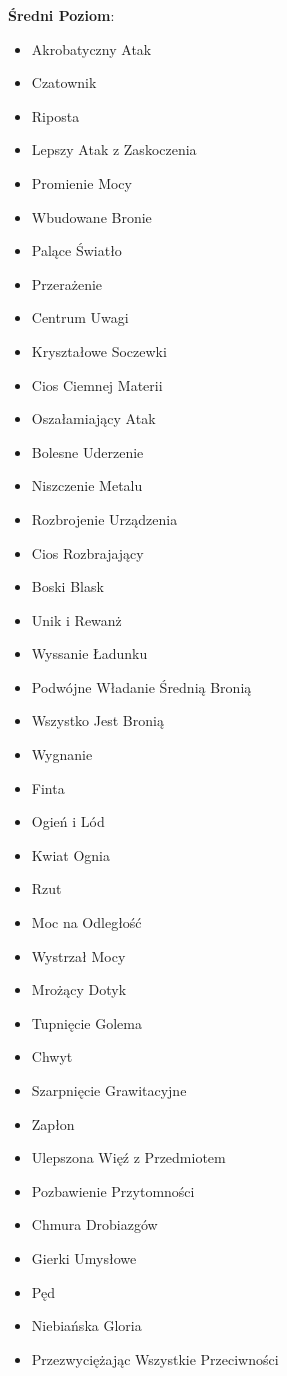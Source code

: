 \textbf{Średni Poziom}:

\begin{itemize}
\item Akrobatyczny Atak
\item Czatownik
\item Riposta
\item Lepszy Atak z Zaskoczenia
\item Promienie Mocy
\item Wbudowane Bronie
\item Palące Światło
\item Przerażenie
\item Centrum Uwagi
\item Kryształowe Soczewki
\item Cios Ciemnej Materii
\item Oszałamiający Atak
\item Bolesne Uderzenie
\item Niszczenie Metalu
\item Rozbrojenie Urządzenia
\item Cios Rozbrajający
\item Boski Blask
\item Unik i Rewanż
\item Wyssanie Ładunku
\item Podwójne Władanie Średnią Bronią
\item Wszystko Jest Bronią
\item Wygnanie
\item Finta
\item Ogień i Lód
\item Kwiat Ognia
\item Rzut
\item Moc na Odległość
\item Wystrzał Mocy
\item Mrożący Dotyk
\item Tupnięcie Golema
\item Chwyt
\item Szarpnięcie Grawitacyjne
\item Zapłon
\item Ulepszona Więź z Przedmiotem
\item Pozbawienie Przytomności
\item Chmura Drobiazgów
\item Gierki Umysłowe
\item Pęd
\item Niebiańska Gloria
\item Przezwyciężając Wszystkie Przeciwności

\end{itemize}
